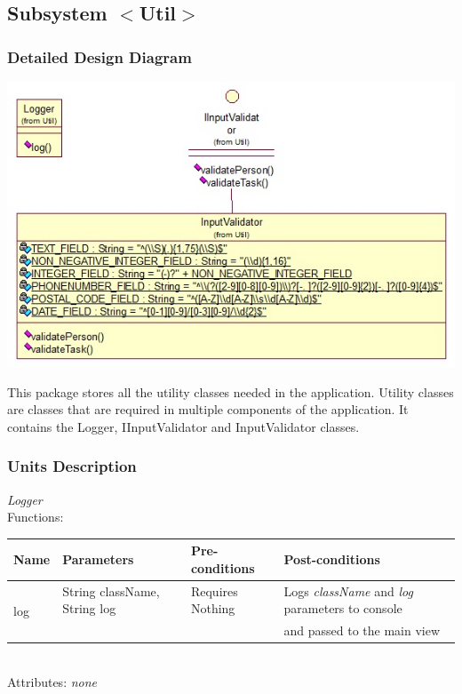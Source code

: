 \subsection{Subsystem $<$Util$>$}

\subsubsection{Detailed Design Diagram}
\includegraphics{subsystems/diagrams/utils_class_diagram}

This package stores all the utility classes needed in the application. Utility classes are classes that are required in multiple components of the application. It contains the Logger, IInputValidator and InputValidator classes.

\subsubsection{Units Description}

\emph{Logger}\\
Functions:\\
\begin{tabular}{| l | l | l | l |}
\hline
Name & Parameters & Pre-conditions & Post-conditions\\
\hline
\multirow{2}{*}{log} & String className, String log & Requires Nothing & Logs \emph{className} and \emph{log} parameters to console
\\&  & & and passed to the main view
\\
\hline
\end{tabular}
\\

Attributes: \emph{none}
\\

